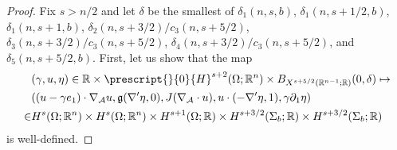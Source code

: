 \documentclass[11pt,letterpaper,reqno]{amsart}
\numberwithin{equation}{section}
\begin{document}
\begin{proof}
    Fix \(s>n/2\) and let \(\delta\) be the smallest of \(\delta_{1}(n,s,b)\), \(\delta_{1}(n,s+1/2,b)\), \(\delta_{1}(n,s+1,b)\), \(\delta_{2}(n,s+3/2)/c_{3}(n,s+5/2)\), \(\delta_{3}(n,s+3/2)/c_{3}(n,s+5/2)\), \(\delta_{4}(n,s+3/2)/c_{3}(n,s+5/2)\), and \(\delta_{5}(n,s+5/2,b)\). First, let us show that the map
    \begin{align}
        &(\gamma,u,\eta) \in \mathbb{R} \times \prescript{}{0}{H}^{s+2}(\Omega;\mathbb{R}^{n}) \times B_{X^{s+5/2}(\mathbb{R}^{n-1};\mathbb{R})}(0,\delta) \mapsto \nonumber\\
        &((u-\gamma e_{1}) \cdot \nabla_{\mathcal{A}}u, \mathfrak{g}(\nabla'\eta,0),J(\nabla_{\mathcal{A}} \cdot u), u \cdot (-\nabla'\eta,1),\gamma \partial_{1}\eta) \nonumber\\
        \in &H^{s}(\Omega;\mathbb{R}^{n}) \times H^{s}(\Omega;\mathbb{R}^{n})  \times H^{s+1}(\Omega;\mathbb{R}) \times H^{s+3/2}(\Sigma_{b};\mathbb{R}) \times H^{s+3/2}(\Sigma_{b};\mathbb{R})
    \end{align}
    is well-defined.
    

\end{proof}
\end{document}

